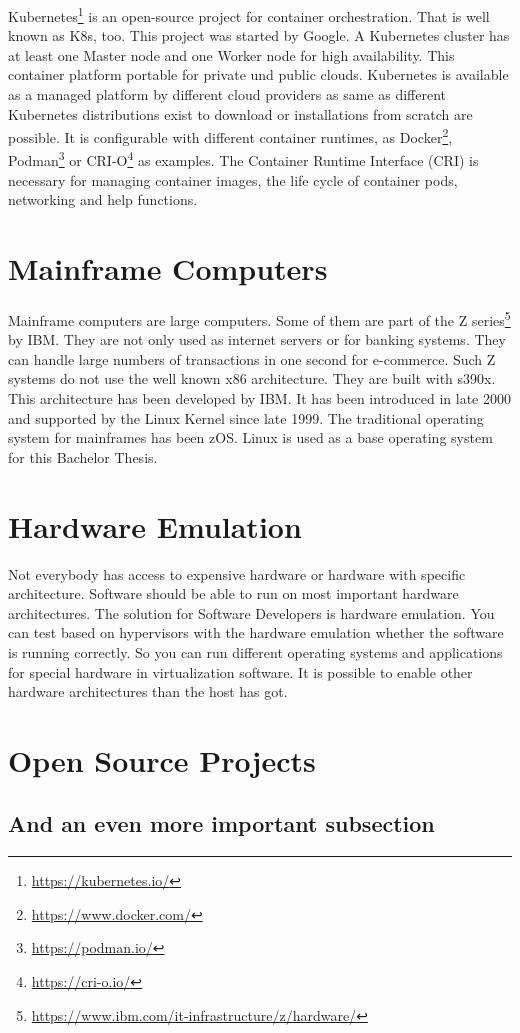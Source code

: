 Kubernetes\footnote{\url{https://kubernetes.io/}} is an open-source project for container orchestration. That is well known as K8s, too. This project was started by Google. A Kubernetes cluster has at least one Master node and one Worker node for high availability. This container platform portable for private und public clouds. Kubernetes is available as a managed platform by different cloud providers as same as different Kubernetes distributions exist to download or installations from scratch are possible. It is configurable with different container runtimes, as Docker\footnote{\url{https://www.docker.com/}}, Podman\footnote{\url{https://podman.io/}} or CRI-O\footnote{\url{https://cri-o.io/}} as examples. The Container Runtime Interface (CRI) is necessary for managing container images, the life cycle of container pods, networking and help functions\cite[~p.16]{Scholl2019}. 
\blindtext

\section{Mainframe Computers}

Mainframe computers are large computers. Some of them are part of the Z series\footnote{\url{https://www.ibm.com/it-infrastructure/z/hardware/}} by IBM. They are not only used as internet servers or for banking systems. They can handle large numbers of transactions in one second for e-commerce\cite[~p.56]{Tanenbaum2014}. Such Z systems do not use the well known x86 architecture. They are built with s390x. This architecture has been developed by IBM. It has been introduced in late 2000 and supported by the Linux Kernel since late 1999\cite[~p.15]{Block2019}. The traditional operating system for mainframes has been z\/OS. Linux is used as a base operating system for this Bachelor Thesis.


\blindtext

\section{Hardware Emulation}

Not everybody has access to expensive hardware or hardware with  specific architecture. Software should be able to run on most important hardware architectures. The solution for Software Developers is hardware emulation. You can test based on hypervisors with the hardware emulation whether the software is running correctly. So you can run different operating systems and applications for special hardware in virtualization software. It is possible to enable other hardware architectures than the host has got.
\blindtext

\section{Open Source Projects}
\blindtext

\subsection{And an even more important subsection}
\blindtext
